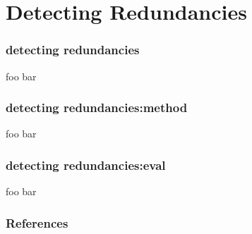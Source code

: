 \documentclass[table]{beamer}
\begin{document}
\section{Detecting Redundancies}
\begin{frame}
  \frametitle{detecting redundancies}
  foo bar
\end{frame}

\begin{frame}
  \frametitle{detecting redundancies:method}
  foo bar
\end{frame}

\begin{frame}
  \frametitle{detecting redundancies:eval}
  foo bar
\end{frame}

\begin{frame}
  \frametitle{References}
  
  
\end{frame}
\end{document}
